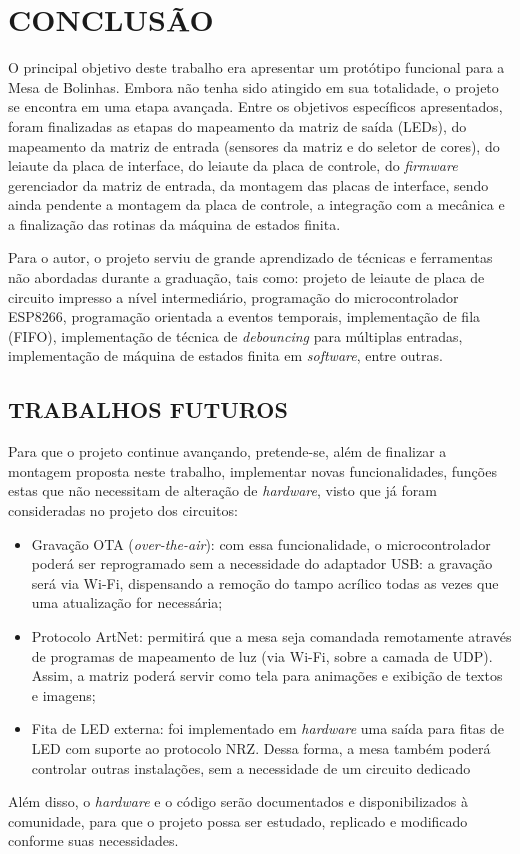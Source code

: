 
\chapter{CONCLUSÃO}
\label{chap:conclusao}

O principal objetivo deste trabalho era apresentar um protótipo funcional para a Mesa de Bolinhas. Embora não tenha sido atingido em sua totalidade, o projeto se encontra em uma etapa avançada. Entre os objetivos específicos apresentados, foram finalizadas as etapas do mapeamento da matriz de saída (LEDs), do mapeamento da matriz de entrada (sensores da matriz e do seletor de cores), do leiaute da placa de interface, do leiaute da placa de controle, do \emph{firmware} gerenciador da matriz de entrada, da montagem das placas de interface, sendo ainda pendente a montagem da placa de controle, a integração com a mecânica e a finalização das rotinas da máquina de estados finita.

Para o autor, o projeto serviu de grande aprendizado de técnicas e ferramentas não abordadas durante a graduação, tais como: projeto de leiaute de placa de circuito impresso a nível intermediário, programação do microcontrolador ESP8266, programação orientada a eventos temporais, implementação de fila (FIFO), implementação de técnica de \emph{debouncing} para múltiplas entradas, implementação de máquina de estados finita em \emph{software}, entre outras.

\section{TRABALHOS FUTUROS}
\label{sec:trabalhosFuturos}

Para que o projeto continue avançando, pretende-se, além de finalizar a montagem proposta neste trabalho, implementar novas funcionalidades, funções estas que não necessitam de alteração de \emph{hardware}, visto que já foram consideradas no projeto dos circuitos:

\begin{itemize}
    \item Gravação OTA (\emph{over-the-air}): com essa funcionalidade, o microcontrolador poderá ser reprogramado sem a necessidade do adaptador USB: a gravação será via Wi-Fi, dispensando a remoção do tampo acrílico todas as vezes que uma atualização for necessária;
    \item Protocolo ArtNet: permitirá que a mesa seja comandada remotamente através de programas de mapeamento de luz (via Wi-Fi, sobre a camada de UDP). Assim, a matriz poderá servir como tela para animações e exibição de textos e imagens;
    \item Fita de LED externa: foi implementado em \emph{hardware} uma saída para fitas de LED com suporte ao protocolo NRZ. Dessa forma, a mesa também poderá controlar outras instalações, sem a necessidade de um circuito dedicado
    
\end{itemize}

Além disso, o \emph{hardware} e o código serão documentados e disponibilizados à comunidade, para que o projeto possa ser estudado, replicado e modificado conforme suas necessidades.
